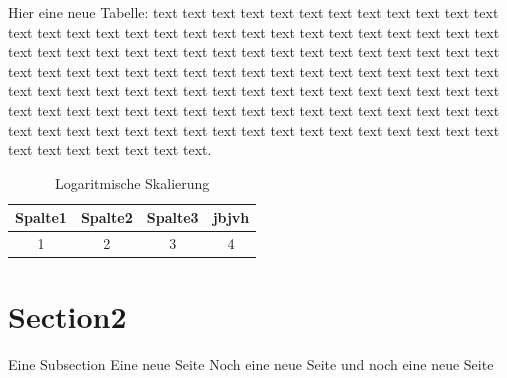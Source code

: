 Hier eine neue Tabelle: text text text text text text text text text text text text text text text text text text text text text text text text text text text text text text text text text text text text text text text text text text text text text text text text text text text text text text text text text text text text text text text text text text text text text text text text text text text text text text text text text text text text text text text text text text text text text text text text text text text text text text text text text text text text text text text text text text text text text text text text text.   
            
            \begin{table}[h]
                \begin{tabular}{cccc}
                      \hline
                      Spalte1 & Spalte2 & Spalte3 & jbjvh\\                      
                      \hline
                      1 & 2 & 3 & 4\\
                      \hline
                \end{tabular}
                \centering
                \caption{Logaritmische Skalierung}
                \label{Tab:Logaritmische Skalierung}
            \end{table}
 
        
        
    \section{Section2}
        Eine Subsection
        \newpage
        Eine neue Seite
        \newpage 
        Noch eine neue Seite
        \newpage    
        und noch eine neue Seite